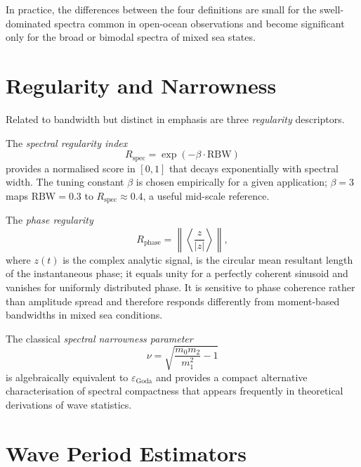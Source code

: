\documentclass[journal]{IEEEtran}
\begin{document}
    In practice, the differences between the four definitions are small
    for the swell-dominated spectra common in open-ocean observations
    and become significant only for the broad or bimodal spectra of
    mixed sea states.

    \section{Regularity and Narrowness}
    \label{sec:regularity}

    Related to bandwidth but distinct in emphasis are three
    \emph{regularity} descriptors.

    The \emph{spectral regularity index}
    \begin{equation}
        R_\mathrm{spec} = \exp(-\beta\cdot\mathrm{RBW})
    \end{equation}
    provides a normalised score in $[0,1]$ that decays exponentially with
    spectral width.
    The tuning constant $\beta$ is chosen empirically for a given
    application; $\beta = 3$ maps $\mathrm{RBW} = 0.3$ to
    $R_\mathrm{spec} \approx 0.4$, a useful mid-scale reference.

    The \emph{phase regularity}
    \begin{equation}
        R_\mathrm{phase} =
        \left\lVert
        \left\langle \frac{z}{|z|} \right\rangle
        \right\rVert,
    \end{equation}
    where $z(t)$ is the complex analytic signal, is the circular mean
    resultant length of the instantaneous phase; it equals unity for a
    perfectly coherent sinusoid and vanishes for uniformly distributed
    phase.
    It is sensitive to phase coherence rather than amplitude spread and
    therefore responds differently from moment-based bandwidths in
    mixed sea conditions.

    The classical \emph{spectral narrowness parameter} \cite{Cartwright1956}
    \begin{equation}
        \nu = \sqrt{\frac{m_0 m_2}{m_1^2} - 1}
        \label{eq:narrowness}
    \end{equation}
    is algebraically equivalent to $\varepsilon_\mathrm{Goda}$ and
    provides a compact alternative characterisation of spectral compactness
    that appears frequently in theoretical derivations of wave statistics.

    \section{Wave Period Estimators}
    \label{sec:periods}
\end{document}
